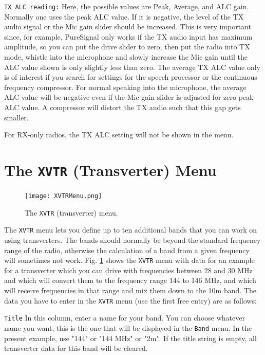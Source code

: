 \documentclass[12pt]{book}
\def\rett#1{\texttt{\color{red}#1}}
\def\bltt#1{\texttt{\color{blue}#1}}
\begin{document}
\rett{TX ALC reading:} Here, the possible values are Peak, Average, and
ALC gain. Normally one uses the peak ALC value. If it is negative, the level
of the TX audio signal or the Mic gain slider should be increased.
This is very important since, for example,
PureSignal only works if the TX audio input has maximum amplitude,
so you can put the drive slider to zero, then put the radio into TX mode,
whistle into the microphone and slowly increase the Mic gain until the
ALC value shown is only slightly less than zero. The average TX ALC
value only is of interest if  you search for settings for the speech processor
or the continuous frequency compressor. For normal speaking into the microphone,
the average ALC value will be negative even if the Mic gain slider is adjusted
for zero peak ALC value. A compressor will distort the TX audio such that this
gap gets smaller.

For RX-only radios, the TX ALC setting will not be shown in the menu.

\section{The \texttt{XVTR} (Transverter) Menu}

\begin{figure}[ht]
\center
\texttt{[image: XVTRMenu.png]}
\caption{The \bltt{XVTR} (transverter) menu.}
\label{fig:XVTRMenu}
\end{figure}

The \bltt{XVTR} menu lets you define up to ten additional bands
that you can work on using transverters. The bands
should normally be beyond the standard frequency range of
the radio, otherwise the calculation of a band from
a given frequency will sometimes not work.
Fig. \ref{fig:XVTRMenu} shows the \bltt{XVTR} menu with data
for an example for a transverter which you can drive with frequencies
between 28 and 30 MHz and which will convert them to the frequency
range 144 to 146 MHz, and which will receive frequencies in that
range and mix them down to the 10m band. The data you have to enter
in the \bltt{XVTR} menu (use the first free entry) are as follows:

\rett{Title} In this column, enter a name for your band. You can choose
whatever name you want, this is the one that will be displayed in the
\bltt{Band} menu. In the present example, use "144" or "144 MHz" or "2m".
If the title string is empty, all transverter data for this band will
be cleared.
\end{document}
